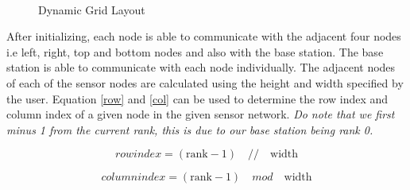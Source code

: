 \documentclass[conference]{IEEEtran}
\begin{document}
	
	\begin{figure}[!t]
		\centering
		\caption{Dynamic Grid Layout}
		\\
		\label{gridlay}
	\end{figure}
	
	
	After initializing, each node is able to communicate with the adjacent four nodes i.e left, right, top and bottom nodes and also with the base station. The base station is able to communicate with each node individually. The adjacent nodes of each of the sensor nodes are calculated using the height and width specified by the user. Equation \ref{row} and \ref{col} can be used to determine the row index and column index of a given node in the given sensor network. \emph{Do note that we first minus 1 from the current rank, this is due to our base station being rank 0.}
	
	
	\begin{equation}
	row index = (\text{rank} - 1) \quad // \quad \text{width}
	\label{row}
	\end{equation}
	
	
	\begin{equation}
	column index = (\text{rank} - 1) \quad mod \quad \text{width}
	\label{col}
	\end{equation}
	
\end{document}
